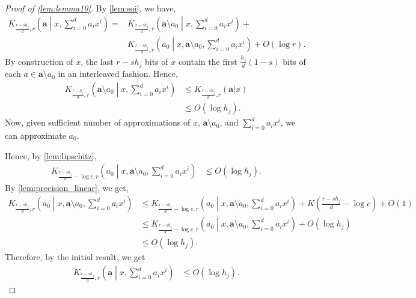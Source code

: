 \documentclass[a4paper,UKenglish,cleveref,autoref,thm-restate]{lipics-v2021}
\begin{document}
\begin{proof}[Proof of \cref{lem:lemma10}]
	By \cref{lem:soi}, we have, 
	\begin{align*}
		K_{\frac{r-sh_j}{d},r}\left(\mathbf{a}\middle|x,\sum_{i=0}^{d}a_ix^i\right)=&K_{\frac{r-sh_j}{d},r}\left(\mathbf{a}\setminus a_0\middle|x,\sum_{i=0}^{d}a_ix^i\right)+\\
		&K_{\frac{r-sh_j}{d},r}\left(a_0\middle|x,\mathbf{a}\setminus a_0,\sum_{i=0}^{d}a_ix^i\right)+O(\log r).
	\end{align*}
	By construction of $x$, the last $r-sh_j$ bits of $x$ contain the first $\frac{h_j}{d}(1-s)$ bits of each $a\in\mathbf{a}\setminus a_0$ in an interleaved fashion. Hence, 
	\begin{align*}
		K_{\frac{r-h_j}{d},r}\left(\mathbf{a}\setminus a_0\middle|x,\sum_{i=0}^{d}a_ix^i\right)&\leq K_{\frac{r-sh_j}{d},r}(\mathbf{a}|x)\\
		&\leq O(\log h_j).
	\end{align*}
	Now, given sufficient number of approximations of $x$, $\mathbf{a}\setminus a_0$, and $\sum_{i=0}^{d}a_ix^i$, we can approximate $a_0$. 
	
	Hence, by \cref{lem:lipschitz}, 
	\begin{align*}
		K_{\frac{r-sh_j}{d}-\log c,r}\left(a_0\middle|x,\mathbf{a}\setminus a_0,\sum_{i=0}^{d}a_ix^i\right)&\leq O(\log h_j).
	\end{align*}
	By \cref{lem:precision_linear}, we get, 
	\begin{align*}
		K_{\frac{r-sh_j}{d},r}\left(a_0\middle|x,\mathbf{a}\setminus a_0,\sum_{i=0}^{d}a_ix^i\right)&\leq K_{\frac{r-sh_j}{d}-\log c,r}\left(a_0\middle|x,\mathbf{a}\setminus a_0,\sum_{i=0}^{d}a_ix^i\right)+K\left(\frac{r-sh_j}{d}-\log c\right)+O(1)\\
		&\leq K_{\frac{r-sh_j}{d}-\log c,r}\left(a_0\middle|x,\mathbf{a}\setminus a_0,\sum_{i=0}^{d}a_ix^i\right)+O(\log h_j)\\
		&\leq O(\log h_j). 
	\end{align*}
	Therefore, by the initial result, we get 
	\begin{align*}
		K_{\frac{r-sh_j}{d},r}\left(\mathbf{a}\middle|x,\sum_{i=0}^{d}a_ix^i\right)&\leq O(\log h_j). 
	\end{align*} 
\end{proof}
\end{document}
